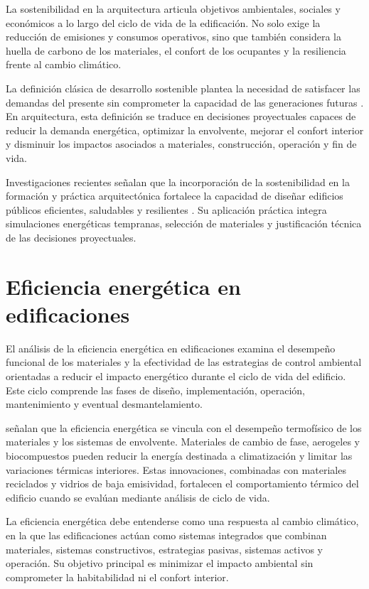 \begin{textoDosTercios}

La sostenibilidad en la arquitectura articula objetivos ambientales, sociales y económicos a lo largo del ciclo de vida de la edificación. No solo exige la reducción de emisiones y consumos operativos, sino que también considera la huella de carbono de los materiales, el confort de los ocupantes y la resiliencia frente al cambio climático.

La definición clásica de desarrollo sostenible plantea la necesidad de satisfacer las demandas del presente sin comprometer la capacidad de las generaciones futuras \parencite{worldcommissiononenvironmentanddevelopmentOurCommonFuture1987}. En arquitectura, esta definición se traduce en decisiones proyectuales capaces de reducir la demanda energética, optimizar la envolvente, mejorar el confort interior y disminuir los impactos asociados a materiales, construcción, operación y fin de vida.

Investigaciones recientes señalan que la incorporación de la sostenibilidad en la formación y práctica arquitectónica fortalece la capacidad de diseñar edificios públicos eficientes, saludables y resilientes \parencite{aloshanSustainableEnvironmentalDesign2024}. Su aplicación práctica integra simulaciones energéticas tempranas, selección de materiales y justificación técnica de las decisiones proyectuales.

\end{textoDosTercios}

\section{Eficiencia energética en edificaciones}

\begin{textoDosTercios}

El análisis de la eficiencia energética en edificaciones examina el desempeño funcional de los materiales y la efectividad de las estrategias de control ambiental orientadas a reducir el impacto energético durante el ciclo de vida del edificio. Este ciclo comprende las fases de diseño, implementación, operación, mantenimiento y eventual desmantelamiento.

\textcite{balNextGenerationBuilding2025} señalan que la eficiencia energética se vincula con el desempeño termofísico de los materiales y los sistemas de envolvente. Materiales de cambio de fase, aerogeles y biocompuestos pueden reducir la energía destinada a climatización y limitar las variaciones térmicas interiores. Estas innovaciones, combinadas con materiales reciclados y vidrios de baja emisividad, fortalecen el comportamiento térmico del edificio cuando se evalúan mediante análisis de ciclo de vida.

La eficiencia energética debe entenderse como una respuesta al cambio climático, en la que las edificaciones actúan como sistemas integrados que combinan materiales, sistemas constructivos, estrategias pasivas, sistemas activos y operación. Su objetivo principal es minimizar el impacto ambiental sin comprometer la habitabilidad ni el confort interior.

\end{textoDosTercios}

